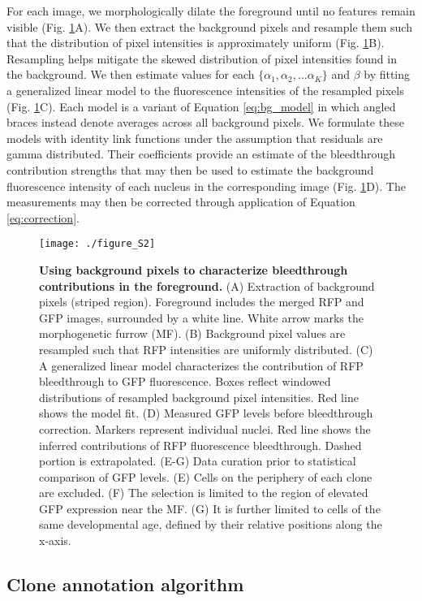 For each image, we morphologically dilate the foreground until no features remain visible (Fig. \ref{fig:figS2}A). We then extract the background pixels and resample them such that the distribution of pixel intensities is approximately uniform (Fig. \ref{fig:figS2}B). Resampling helps mitigate the skewed distribution of pixel intensities found in the background. We then estimate values for each $\{\alpha_1, \alpha_2, \ldots \alpha_K\}$ and $\beta$ by fitting a generalized linear model to the fluorescence intensities of the resampled pixels (Fig. \ref{fig:figS2}C). Each model is a variant of Equation \ref{eq:bg_model} in which angled braces instead denote averages across all background pixels. We formulate these models with identity link functions under the assumption that residuals are gamma distributed. Their coefficients provide an estimate of the bleedthrough contribution strengths that may then be used to estimate the background fluorescence intensity of each nucleus in the corresponding image (Fig. \ref{fig:figS2}D). The measurements may then be corrected through application of Equation \ref{eq:correction}. 


\begin{figure}[h]
\texttt{[image: ./figure\_S2]}
\caption[Characterization of bleedthrough contribution strengths.]{\textbf{Using background pixels to characterize bleedthrough contributions in the foreground.} (A) Extraction of background pixels (striped region). Foreground includes the merged RFP and GFP images, surrounded by a white line. White arrow marks the morphogenetic furrow (MF). (B) Background pixel values are resampled such that RFP intensities are uniformly distributed. (C) A generalized linear model characterizes the contribution of RFP bleedthrough to GFP fluorescence. Boxes reflect windowed distributions of resampled background pixel intensities. Red line shows the model fit. (D) Measured GFP levels before bleedthrough correction. Markers represent individual nuclei. Red line shows the inferred contributions of RFP fluorescence bleedthrough. Dashed portion is extrapolated. (E-G) Data curation prior to statistical comparison of GFP levels. (E) Cells on the periphery of each clone are excluded. (F) The selection is limited to the region of elevated GFP expression near the MF. (G) It is further limited to cells of the same developmental age, defined by their relative positions along the x-axis.}
\label{fig:figS2}
\end{figure}

\subsection{Clone annotation algorithm} 


